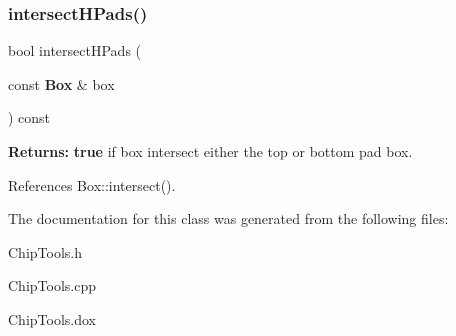 \subsubsection{\texorpdfstring{intersect\+H\+Pads()}{intersectHPads()}}
{\footnotesize\ttfamily bool intersect\+H\+Pads (\begin{DoxyParamCaption}\item[{const \textbf{ Box} \&}]{box }\end{DoxyParamCaption}) const\hspace{0.3cm}{\ttfamily [inline]}}

{\bfseries Returns\+:} {\bfseries true} if {\ttfamily box} intersect either the top or bottom pad box. 

References Box\+::intersect().



The documentation for this class was generated from the following files\+:\begin{DoxyCompactItemize}
\item 
Chip\+Tools.\+h\item 
Chip\+Tools.\+cpp\item 
Chip\+Tools.\+dox\end{DoxyCompactItemize}
